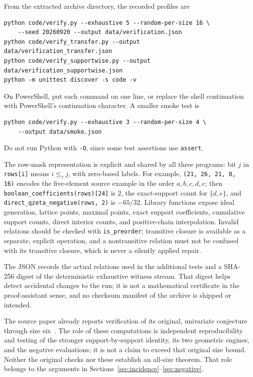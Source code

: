 \documentclass[11pt]{article}
\numberwithin{equation}{section}
\theoremstyle{definition}
\theoremstyle{remark}
\begin{document}
From the extracted archive directory, the recorded profiles are
\begin{lstlisting}
python code/verify.py --exhaustive 5 --random-per-size 16 \
    --seed 20260920 --output data/verification.json
python code/verify_transfer.py --output data/verification_transfer.json
python code/verify_supportwise.py --output data/verification_supportwise.json
python -m unittest discover -s code -v
\end{lstlisting}
On PowerShell, put each command on one line, or replace the shell
continuation with PowerShell's continuation character. A smaller smoke test is
\begin{lstlisting}
python code/verify.py --exhaustive 3 --random-per-size 4 \
    --output data/smoke.json
\end{lstlisting}
Do not run Python with \texttt{-O}, since some test assertions use
\texttt{assert}.

The row-mask representation is explicit and shared by all three programs: bit
$j$ in \texttt{rows[i]} means $i\le_\tau j$, with zero-based labels. For
example, \texttt{(21, 26, 21, 8, 16)} encodes the five-element source example
in the order $a,b,c,d,e$; then
\texttt{boolean\_coefficients(rows)[24]} is $2$, the exact-support count for
$\{d,e\}$, and \texttt{direct\_qzeta\_negative(rows, 2)} is $-65/32$. Library
functions expose ideal generation, lattice points, maximal points, exact
support coefficients, cumulative support counts, direct interior counts, and
positive-chain interpolation. Invalid relations should be checked with
\texttt{is\_preorder}; transitive closure is available as a separate, explicit
operation, and a nontransitive relation must not be confused with its
transitive closure, which is never a silently applied repair.

The JSON records the actual relations used in the additional tests and a
SHA-256 digest of the deterministic exhaustive witness stream. That digest
helps detect accidental changes to the run; it is not a mathematical
certificate in the proof-assistant sense, and no checksum manifest of the
archive is shipped or intended.

The source paper already reports verification of its original, univariate
conjecture through size six~\cite[p.~15]{AC}. The role of these computations
is independent reproducibility and testing of the stronger support-by-support
identity, its two geometric engines, and the negative evaluations; it is not a
claim to exceed that original size bound. Neither the original checks nor
these establish an all-size theorem. That role belongs to the arguments in
Sections~\ref{sec:incidence}--\ref{sec:negative}.
\end{document}
